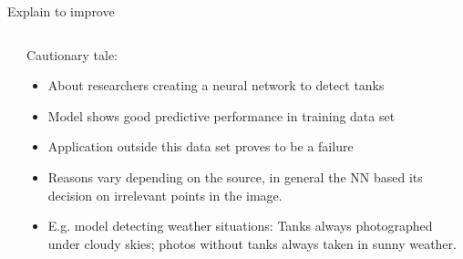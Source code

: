 \documentclass[11pt,compress,t,notes=noshow, aspectratio=169, xcolor=table]{beamer}
\begin{document}
\begin{frame}{Explain to improve}
\begin{columns}[T]
\begin{column}{0.45\textwidth}
	\end{column}
	\begin{column}{0.55\textwidth}
    Cautionary tale:
	\begin{itemize}
	    \item About researchers creating a neural network to detect tanks
        \item Model shows good predictive performance in training data set
        \item Application outside this data set proves to be a failure
        \item<2-> Reasons vary depending on the source, in general the NN based its decision on irrelevant points in the image. \item<2-> E.g. model detecting weather situations: Tanks always photographed under cloudy skies; photos without tanks always taken in sunny weather.
	\end{itemize}

	\end{column}
	\end{columns}
\end{frame}




\end{document}
